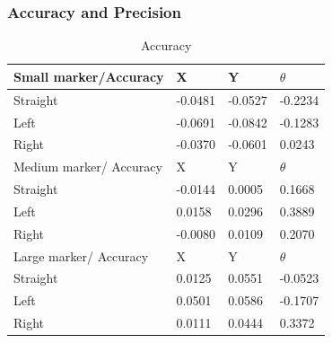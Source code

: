 \documentclass[11pt,a4paper]{article}
\begin{document}
				\subsubsection{Accuracy and Precision}
				\begin{table}[h]
					\centering
					\caption{Accuracy}
					\label{accuracy}
					\begin{tabular}{|l|l|l|l|}
						\hline
						Small marker/Accuracy   & X       & Y       & $\theta$ \\ \hline
						Straight                & -0.0481 & -0.0527 & -0.2234     \\ \hline
						Left                    & -0.0691 & -0.0842 & -0.1283     \\ \hline
						Right                   & -0.0370 & -0.0601 & 0.0243      \\ \hline
						Medium marker/ Accuracy & X       & Y       & $\theta$ \\ \hline
						Straight                & -0.0144 & 0.0005  & 0.1668      \\ \hline
						Left                    & 0.0158  & 0.0296  & 0.3889      \\ \hline
						Right                   & -0.0080 & 0.0109  & 0.2070      \\ \hline
						Large marker/ Accuracy  & X       & Y       & $\theta$ \\ \hline
						Straight                & 0.0125  & 0.0551  & -0.0523     \\ \hline
						Left                    & 0.0501  & 0.0586  & -0.1707     \\ \hline
						Right                   & 0.0111  & 0.0444  & 0.3372      \\ \hline
					\end{tabular}
				\end{table}
				
\end{document}

